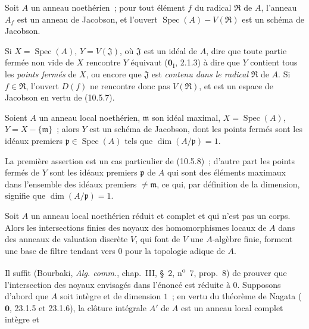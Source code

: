\begin{corollary}[10.5.8]
\label{IV.10.5.8-fr}
Soit $A$ un anneau noethérien~; pour tout élément $f$ du radical $\mathfrak R$
de $A$, l'anneau $A_f$ est un anneau de Jacobson, et l'ouvert
$\operatorname{Spec}(A)-V(\mathfrak R)$ est un schéma de Jacobson.
\end{corollary}

Si $X=\operatorname{Spec}(A)$, $Y=V(\mathfrak J)$, où $\mathfrak J$ est un
idéal de $A$, dire que toute partie fermée non vide de $X$ rencontre $Y$
équivaut ($\mathbf 0_{\mathrm I}$, 2.1.3) à dire que $Y$ contient tous les
\emph{points fermés} de $X$, ou encore que $\mathfrak J$ est \emph{contenu
dans le radical} $\mathfrak R$ de $A$. Si $f\in\mathfrak R$, l'ouvert $D(f)$
ne rencontre donc pas $V(\mathfrak R)$, et est un espace de Jacobson en vertu
de (10.5.7).

\begin{corollary}[10.5.9]
\label{IV.10.5.9-fr}
Soient $A$ un anneau local noethérien, $\mathfrak m$ son idéal maximal,
$X=\operatorname{Spec}(A)$, $Y=X-\{\mathfrak m\}$~; alors $Y$ est un schéma de
Jacobson, dont les points fermés sont les idéaux premiers
$\mathfrak p\in\operatorname{Spec}(A)$ tels que $\dim(A/\mathfrak p)=1$.
\end{corollary}

La première assertion est un cas particulier de (10.5.8)~; d'autre part les
points fermés de $Y$ sont les idéaux premiers $\mathfrak p$ de $A$ qui sont
des éléments maximaux dans l'ensemble des idéaux premiers $\neq\mathfrak m$,
ce qui, par définition de la dimension, signifie que
$\dim(A/\mathfrak p)=1$.

\begin{proposition}[10.5.10]
\label{IV.10.5.10-fr}
Soit $A$ un anneau local noethérien réduit et complet et qui n'est pas un
corps. Alors les intersections finies des noyaux des homomorphismes locaux de
$A$ dans des anneaux de valuation discrète $V$, qui font de $V$ une
$A$-algèbre finie, forment une base de filtre tendant vers $0$ pour la
topologie adique de $A$.
\end{proposition}

Il suffit (Bourbaki, \emph{Alg. comm.}, chap.~III, \S~2,
n\textsuperscript{o}~7, prop.~8) de prouver que l'intersection des noyaux
envisagés dans l'énoncé est réduite à $0$. Supposons d'abord que $A$ soit
intègre et de dimension $1$~; en vertu du théorème de Nagata ($\mathbf 0$,
23.1.5 et 23.1.6), la clôture intégrale $A'$ de $A$ est un anneau local
complet intègre et

